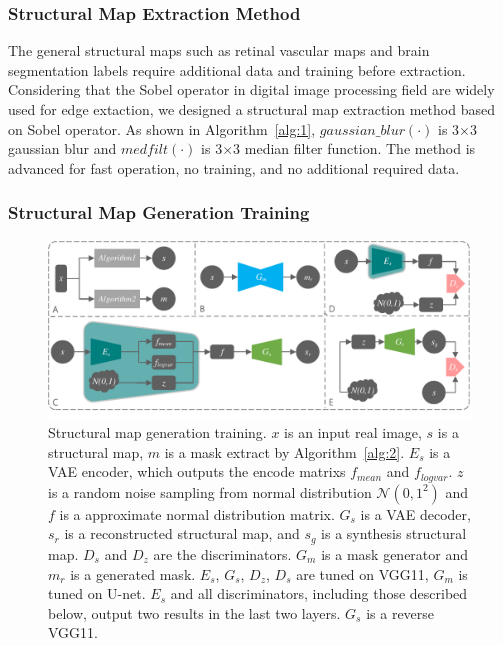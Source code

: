 \documentclass[runningheads]{llncs}
\begin{document}
	\subsubsection{Structural Map Extraction Method}
	The general structural maps such as retinal vascular maps\cite{41costa2017towards} and brain segmentation labels \cite{4shin2018medical} require additional data and training before extraction. Considering that the Sobel operator\cite{147Sobel} in digital image processing field are widely used for edge extaction, we designed a structural map extraction method based on Sobel operator. As shown in Algorithm~\ref{alg:1}, $gaussian\_blur(\cdot)$ is 3$\times$3 gaussian blur and $medfilt(\cdot)$ is 3$\times$3 median filter function. The method is advanced for fast operation, no training, and no additional required data. 
	\subsubsection{Structural Map Generation Training}
	\begin{figure}[th]
		\centering
		\includegraphics[width=1\columnwidth]{figures/feature_train}
		\caption{Structural map generation training. $x$ is an input real image, $s$ is a structural map, $m$ is a mask extract by Algorithm~\ref{alg:2}. $E_s$ is a VAE encoder, which outputs the encode matrixs $f_{mean}$ and $f_{logvar}$. $z$ is a random noise sampling from normal distribution $\mathcal{N}(0,1^2)$ and $f$ is a approximate normal distribution matrix. $G_s$ is a VAE decoder, $s_r$ is a reconstructed structural map, and $s_g$ is a synthesis structural map. $D_{s}$ and $D_{z}$ are the discriminators. $G_m$ is a mask generator and $m_r$ is a generated mask. $E_s $, $G_s$, $D_{z} $, $D_{s} $ are tuned on VGG11\cite{102simonyan2014very}, $G_m $ is tuned on U-net\cite{6zhu2017unpaired}. $E_s$ and all discriminators, including those described below, output two results in the last two layers. $G_s$ is a reverse VGG11. }
		\label{feature_train}
	\end{figure}
\end{document}
